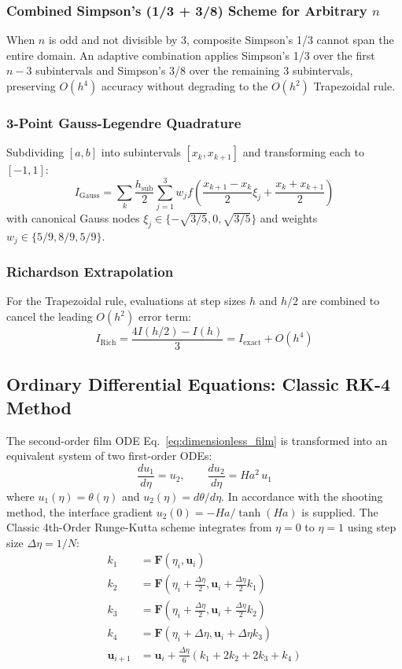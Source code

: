 \documentclass[11pt,a4paper]{article}
\begin{document}
\subsubsection{Combined Simpson's (1/3 + 3/8) Scheme for Arbitrary $n$}
When $n$ is odd and not divisible by 3, composite Simpson's 1/3 cannot span the entire domain. An adaptive combination applies Simpson's 1/3 over the first $n-3$ subintervals and Simpson's 3/8 over the remaining 3 subintervals, preserving $O(h^4)$ accuracy without degrading to the $O(h^2)$ Trapezoidal rule.

\subsubsection{3-Point Gauss-Legendre Quadrature}
Subdividing $[a, b]$ into subintervals $[x_k, x_{k+1}]$ and transforming each to $[-1, 1]$:
\begin{equation}
I_{\text{Gauss}} = \sum_{k} \frac{h_{\text{sub}}}{2} \sum_{j=1}^{3} w_j f\left( \frac{x_{k+1}-x_k}{2} \xi_j + \frac{x_k+x_{k+1}}{2} \right)
\end{equation}
with canonical Gauss nodes $\xi_j \in \{ -\sqrt{3/5}, 0, \sqrt{3/5} \}$ and weights $w_j \in \{ 5/9, 8/9, 5/9 \}$.

\subsubsection{Richardson Extrapolation}
For the Trapezoidal rule, evaluations at step sizes $h$ and $h/2$ are combined to cancel the leading $O(h^2)$ error term:
\begin{equation}
I_{\text{Rich}} = \frac{4 I(h/2) - I(h)}{3} = I_{\text{exact}} + O(h^4)
\end{equation}

\subsection{Ordinary Differential Equations: Classic RK-4 Method}
The second-order film ODE Eq.~\eqref{eq:dimensionless_film} is transformed into an equivalent system of two first-order ODEs:
\begin{equation}
\frac{d u_1}{d\eta} = u_2, \qquad \frac{d u_2}{d\eta} = Ha^2 \, u_1
\end{equation}
where $u_1(\eta) = \theta(\eta)$ and $u_2(\eta) = d\theta/d\eta$. In accordance with the shooting method, the interface gradient $u_2(0) = -Ha/\tanh(Ha)$ is supplied. The Classic 4th-Order Runge-Kutta scheme integrates from $\eta = 0$ to $\eta = 1$ using step size $\Delta\eta = 1/N$:
\begin{align}
k_{1} &= \mathbf{F}(\eta_i, \mathbf{u}_i) \\
k_{2} &= \mathbf{F}\left(\eta_i + \frac{\Delta\eta}{2}, \mathbf{u}_i + \frac{\Delta\eta}{2} k_1\right) \\
k_{3} &= \mathbf{F}\left(\eta_i + \frac{\Delta\eta}{2}, \mathbf{u}_i + \frac{\Delta\eta}{2} k_2\right) \\
k_{4} &= \mathbf{F}(\eta_i + \Delta\eta, \mathbf{u}_i + \Delta\eta k_3) \\
\mathbf{u}_{i+1} &= \mathbf{u}_i + \frac{\Delta\eta}{6} (k_1 + 2k_2 + 2k_3 + k_4)
\end{align}
\end{document}
